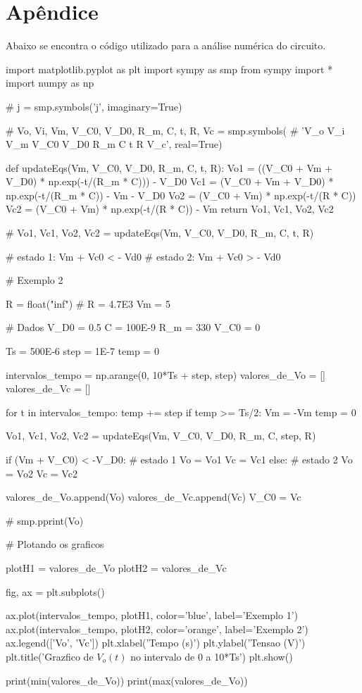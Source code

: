 \section{Apêndice}
\label{ap:apendice}


Abaixo se encontra o código utilizado para a análise numérica do circuito.

\begin{python}
    import matplotlib.pyplot as plt
    import sympy as smp
    from sympy import *
    import numpy as np

    # j = smp.symbols('j', imaginary=True)

    # Vo, Vi, Vm, V_C0, V_D0, R_m, C, t, R, Vc = smp.symbols(
    #     'V_o V_i V_m V_C0 V_D0 R_m C t R V_c', real=True)


    def updateEqs(Vm, V_C0, V_D0, R_m, C, t, R):
    Vo1 = ((V_C0 + Vm + V_D0) * np.exp(-t/(R_m * C))) - V_D0
    Vc1 = (V_C0 + Vm + V_D0) * np.exp(-t/(R_m * C)) - Vm - V_D0
    Vo2 = (V_C0 + Vm) * np.exp(-t/(R * C))
    Vc2 = (V_C0 + Vm) * np.exp(-t/(R * C)) - Vm
    return Vo1, Vc1, Vo2, Vc2


    # Vo1, Vc1, Vo2, Vc2 = updateEqs(Vm, V_C0, V_D0, R_m, C, t, R)


    # estado 1: Vm + Vc0 < - Vd0
    # estado 2: Vm + Vc0 > - Vd0

    # Exemplo 2

    R = float("inf")
    # R = 4.7E3
    Vm = 5

    # Dados
    V_D0 = 0.5
    C = 100E-9
    R_m = 330
    V_C0 = 0

    Ts = 500E-6
    step = 1E-7
    temp = 0

    intervalos_tempo = np.arange(0, 10*Ts + step, step)
    valores_de_Vo = []
    valores_de_Vc = []

    for t in intervalos_tempo:
    temp += step
    if temp >= Ts/2:
    Vm = -Vm
    temp = 0

    Vo1, Vc1, Vo2, Vc2 = updateEqs(Vm, V_C0, V_D0, R_m, C, step, R)

    if (Vm + V_C0) < -V_D0:  # estado 1
    Vo = Vo1
    Vc = Vc1
    else:                   # estado 2
    Vo = Vo2
    Vc = Vc2

    valores_de_Vo.append(Vo)
    valores_de_Vc.append(Vc)
    V_C0 = Vc


    # smp.pprint(Vo)

    # Plotando os graficos


    plotH1 = valores_de_Vo
    plotH2 = valores_de_Vc


    fig, ax = plt.subplots()

    ax.plot(intervalos_tempo, plotH1, color='blue', label='Exemplo 1')
    ax.plot(intervalos_tempo, plotH2, color='orange', label='Exemplo 2')
    ax.legend(['Vo', 'Vc'])
    plt.xlabel('Tempo (s)')
    plt.ylabel('Tensao (V)')
    plt.title('Grazfico de $V_o(t)$ no intervalo de 0 a 10*Ts')
    plt.show()


    print(min(valores_de_Vo))
    print(max(valores_de_Vo))

\end{python}